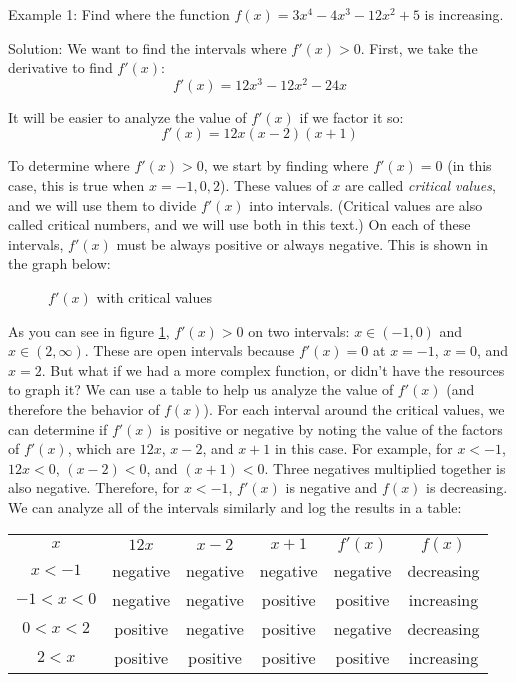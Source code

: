 Example 1: Find where the function $f(x) = 3x^4-4x^3-12x^2+5$ is increasing. 

Solution: We want to find the intervals where $f'(x)>0$. First, we take the 
derivative to find $f'(x)$:
$$f'(x) = 12x^3-12x^2-24x$$

It will be easier to analyze the value of $f'(x)$ if we factor it so:
$$f'(x) = 12x(x-2)(x+1)$$

To determine where $f'(x)>0$, we start by finding where $f'(x)=0$ (in this 
case, this is true when $x=-1, 0, 2$). These values of $x$ are called \textit{
critical values}, and we will use them to divide $f'(x)$ into intervals. 
(Critical values are also called critical numbers, and we will use both in 
this text.) On each of these intervals, $f'(x)$ must be always positive or 
always negative. This is shown in the graph below:

\begin{figure}
	\caption{$f'(x)$ with critical values}
	\label{fig:critval1}
\end{figure}


As you can see in figure \ref{fig:critval1}, $f'(x)>0$ on two intervals: $x 
\in (-1, 0) $ and $x \in (2, \infty)$. These are open intervals because $f'(x) 
= 0$ at $x = -1$, $x = 0$, and $x = 2$. But what if we had a more complex 
function, or didn't have the resources to graph it? We can use a table to help 
us analyze the value of $f'(x)$ (and therefore the behavior of $f(x)$). For 
each interval around the critical values, we can determine if $f'(x)$ is 
positive or negative by noting the value of the factors of $f'(x)$, which are 
$12x$, $x-2$, and $x+1$ in this case. For example, for $x < -1$, $12x < 0$, $(
x - 2) < 0$, and $(x + 1) < 0$. Three negatives multiplied together is also 
negative. Therefore, for $x<-1$, $f'(x)$ is negative and $f(x)$ is decreasing. 
We can analyze all of the intervals similarly and log the results in a table:

\begin{tabular}{c | c | c |c|c|c}
\hline
$x$ & $12x$ & $x-2$ & $x+1$ & $f'(x)$ & $f(x)$ \\
$x<-1$ & negative & negative & negative & negative &decreasing\\
$-1<x<0$ & negative & negative & positive & positive & increasing \\
$0<x<2$ & positive & negative & positive & negative & decreasing \\
$2<x$ & positive & positive & positive & positive & increasing\\
\end{tabular}

